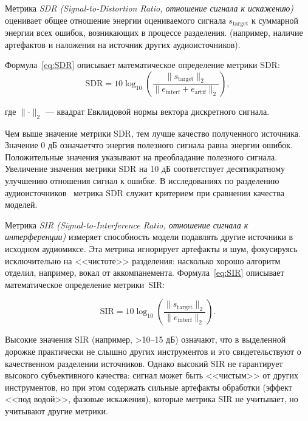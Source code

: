 \documentclass[14pt]{extarticle}
\begin{document}
Метрика \textit{SDR (Signal-to-Distortion Ratio, отношение сигнала к искажению)} оценивает
общее отношение энергии оцениваемого сигнала $s_{\mathrm{target}}$ к суммарной энергии всех ошибок, возникающих в процессе разделения.
(например, наличие артефактов и наложения на источник других аудиоисточников).

Формула~\ref{eq:SDR} описывает математическое определение метрики SDR:
\begin{equation}
	\label{eq:SDR}
    \mathrm{SDR} = 10 \log_{10} \left( \frac{\lVert s_{\mathrm{target}} \rVert_2}{\lVert e_{\mathrm{interf}} + e_{\mathrm{artif}} \rVert_2} \right),
\end{equation}

\noindent где $\lVert \cdot \rVert_2$ --- квадрат Евклидовой нормы вектора дискретного сигнала.

Чем выше значение метрики SDR, тем лучше качество полученного источника. 
Значение 0 дБ означаетчто энергия полезного сигнала равна энергии ошибок. Положительные значения указывают на 
преобладание полезного сигнала. Увеличение значения метрики SDR на 10 дБ соответствует десятикратному 
улучшению отношения сигнал к ошибке. В исследованиях по разделению аудиоисточников~\cite{demucs, Spleeter, openunmix} метрика SDR служит 
критерием при сравнении качества моделей.

\par Метрика \textit{SIR (Signal-to-Interference Ratio, отношение сигнала к интерференции)} измеряет способность модели 
подавлять другие источники в исходном аудиомиксе.
Эта метрика игнорирует артефакты и шум, фокусируясь исключительно на <<чистоте>> разделения: насколько хорошо алгоритм 
отделил, например, вокал от аккомпанемента.
Формула~\ref{eq:SIR} описывает математическое определение метрики~SIR:

\begin{equation}
	\label{eq:SIR}
    \mathrm{SIR} = 10 \log_{10} \left( \frac{\lVert s_{\mathrm{target}} \rVert_2}{\lVert e_{\mathrm{interf}} \rVert_2} \right).
\end{equation}

Высокие значения SIR (например, >10–15 дБ) означают, что в выделенной дорожке практически не слышно других инструментов
и это свидетельствуют о качественном разделении источников.
Однако высокий SIR не гарантирует высокого субъективного качества: сигнал может быть <<чистым>> от других инструментов, 
но при этом содержать сильные артефакты обработки (эффект <<под водой>>, фазовые искажения), которые метрика SIR не учитывает, но учитывают другие метрики.
\end{document}
